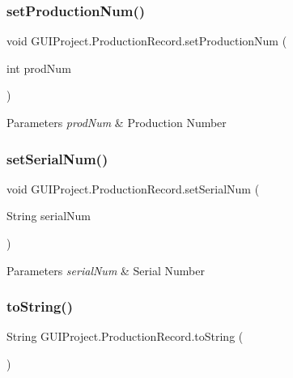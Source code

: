 \subsubsection{\texorpdfstring{setProductionNum()}{setProductionNum()}}
{\footnotesize\ttfamily void G\+U\+I\+Project.\+Production\+Record.\+set\+Production\+Num (\begin{DoxyParamCaption}\item[{int}]{prod\+Num }\end{DoxyParamCaption})}


\begin{DoxyParams}{Parameters}
{\em prod\+Num} & Production Number \\
\hline
\end{DoxyParams}
\mbox{\label{class_g_u_i_project_1_1_production_record_a989bfbd7de039c6bfcfeed41a0818c2c}} 
\subsubsection{\texorpdfstring{setSerialNum()}{setSerialNum()}}
{\footnotesize\ttfamily void G\+U\+I\+Project.\+Production\+Record.\+set\+Serial\+Num (\begin{DoxyParamCaption}\item[{String}]{serial\+Num }\end{DoxyParamCaption})}


\begin{DoxyParams}{Parameters}
{\em serial\+Num} & Serial Number \\
\hline
\end{DoxyParams}
\mbox{\label{class_g_u_i_project_1_1_production_record_a5fc9ac59bf5886f0b00ae3d9c491f64b}} 
\subsubsection{\texorpdfstring{toString()}{toString()}}
{\footnotesize\ttfamily String G\+U\+I\+Project.\+Production\+Record.\+to\+String (\begin{DoxyParamCaption}{ }\end{DoxyParamCaption})}

